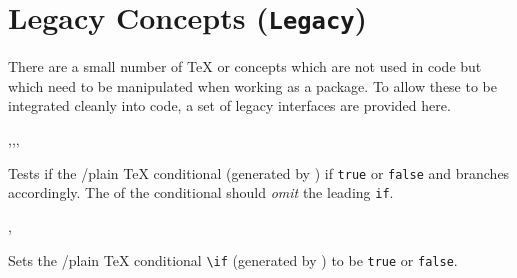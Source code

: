 \documentclass[oneside]{book}
\let\tn=\cs
\begin{document}

\chapter{Legacy Concepts (\texttt{Legacy})}

There are a small number of \TeX{} or \LaTeXe{} concepts which are not used
in  code but which need to be manipulated when working as a \LaTeXe{}
package. To allow these to be integrated cleanly into  code, a set
of legacy interfaces are provided here.

\begin{function}{\LegacyIf,\LegacyIfT,\LegacyIfF,\LegacyIfTF}
\begin{syntax}
 
  
  
   
\end{syntax}
Tests if the \LaTeXe{}/plain \TeX{} conditional (generated by \tn{newif})
if \texttt{true} or \texttt{false} and branches \hbox{accordingly}. The
 of the conditional should \emph{omit} the leading \texttt{if}.
\begin{demohigh}
\newif \ifFooBar
{} {} {}
\end{demohigh}
\end{function}

\begin{function}{\LegacyIfSetTrue,\LegacyIfSetFalse}
\begin{syntax}
 
 
\end{syntax}
Sets the \LaTeXe{}/plain \TeX{} conditional \verb|\if|
(generated by \tn{newif}) to be \texttt{true} or \texttt{false}.
\begin{demohigh}
\newif \ifFooBar
{}
 {} {}
\end{demohigh}
\end{function}
\end{document}
